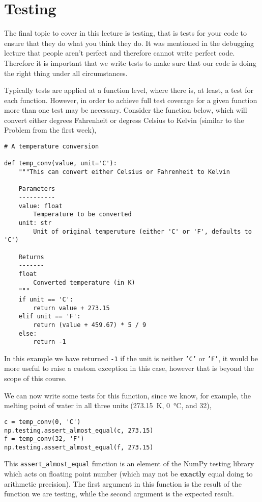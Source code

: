 \documentclass[a4paper]{article}
\begin{document}
\section{Testing}
The final topic to cover in this lecture is testing, that is tests for your code to ensure that they do what you think they do.
It was mentioned in the debugging lecture that people aren't perfect and therefore cannot write perfect code.
Therefore it is important that we write tests to make sure that our code is doing the right thing under all circumstances.

Typically tests are applied at a function level, where there is, at least, a test for each function.
However, in order to achieve full test coverage for a given function more than one test may be necessary.
Consider the function below, which will convert either degrees Fahrenheit or degress Celsius to Kelvin (similar to the Problem from the first week),
\begin{lstlisting}
# A temperature conversion

def temp_conv(value, unit='C'):
    """This can convert either Celsius or Fahrenheit to Kelvin

    Parameters
    ----------
    value: float
        Temperature to be converted
    unit: str
        Unit of original temperuture (either 'C' or 'F', defaults to 'C')

    Returns
    -------
    float
        Converted temperature (in K)
    """
    if unit == 'C':
        return value + 273.15
    elif unit == 'F':
        return (value + 459.67) * 5 / 9
    else:
        return -1
\end{lstlisting}
In this example we have returned \texttt{-1} if the unit is neither \texttt{'C'} or \texttt{'F'}, it would be more useful to raise a custom exception in this case, however that is beyond the scope of this course.

We can now write some tests for this function, since we know, for example, the melting point of water in all three units (\SI{273.15}{\kelvin}, \SI{0}{\celsius}, and \SI{32}{\Fahrenheit}),
\begin{lstlisting}
c = temp_conv(0, 'C')
np.testing.assert_almost_equal(c, 273.15)
f = temp_conv(32, 'F')
np.testing.assert_almost_equal(f, 273.15)
\end{lstlisting}
This \texttt{assert\_almost\_equal} function is an element of the NumPy testing library which acts on floating point number (which may not be \textbf{exactly} equal doing to arithmetic precision).
The first argument in this function is the result of the function we are testing, while the second argument is the expected result.
\end{document}
